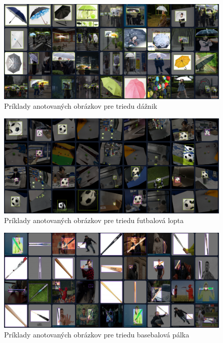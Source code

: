 \begin{figure}[H]
\centering
\includegraphics[width=\textwidth]{images/umbrella_example_annotations.png}
\caption{Príklady anotovaných obrázkov pre triedu dážnik}
\label{fig:image6006}
\end{figure}

\begin{figure}[H]
\centering
\includegraphics[width=\textwidth]{images/football_example_annotations.png}
\caption{Príklady anotovaných obrázkov pre triedu futbalová lopta}
\label{fig:image6007}
\end{figure}

\begin{figure}[H]
\centering
\includegraphics[width=\textwidth]{images/bat_example_annotations.png}
\caption{Príklady anotovaných obrázkov pre triedu basebalová pálka}
\label{fig:image6008}
\end{figure}

